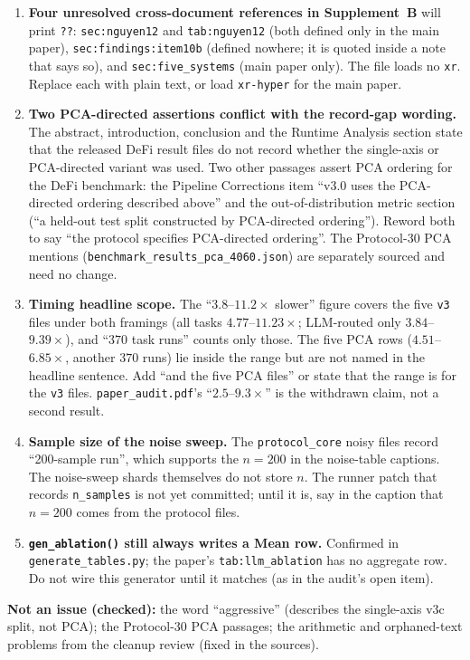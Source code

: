 \documentclass[11pt]{article}
\begin{document}
\begin{enumerate}
  \item \textbf{Four unresolved cross-document references in Supplement~B} will print \texttt{??}: \texttt{sec:nguyen12} and
    \texttt{tab:nguyen12} (both defined only in the main paper), \texttt{sec:findings:item10b} (defined nowhere; it is
    quoted inside a note that says so), and \texttt{sec:five\_systems} (main paper only). The file loads no \texttt{xr}.
    Replace each with plain text, or load \texttt{xr-hyper} for the main paper.
  \item \textbf{Two PCA-directed assertions conflict with the record-gap wording.} The abstract, introduction, conclusion and
    the Runtime Analysis section state that the released DeFi result files do not record whether the single-axis or PCA-directed variant
    was used. Two other passages assert PCA ordering for the DeFi benchmark: the Pipeline Corrections item
    ``v3.0 uses the PCA-directed ordering described above'' and the out-of-distribution metric section (``a held-out test split
    constructed by PCA-directed ordering''). Reword both to say ``the protocol specifies PCA-directed ordering''. The
    Protocol-30 PCA mentions (\texttt{benchmark\_results\_pca\_4060.json}) are separately sourced and need no change.
  \item \textbf{Timing headline scope.} The ``$3.8$--$11.2\times$ slower'' figure covers the five \texttt{v3} files under both
    framings (all tasks $4.77$--$11.23\times$; LLM-routed only $3.84$--$9.39\times$), and ``$370$ task runs'' counts only
    those. The five PCA rows ($4.51$--$6.85\times$, another $370$ runs) lie inside the range but are not named in the
    headline sentence. Add ``and the five PCA files'' or state that the range is for the \texttt{v3} files.
    \texttt{paper\_audit.pdf}'s ``$2.5$--$9.3\times$'' is the withdrawn claim, not a second result.
  \item \textbf{Sample size of the noise sweep.} The \texttt{protocol\_core} noisy files record ``200-sample run'', which
    supports the $n=200$ in the noise-table captions. The noise-sweep shards themselves do not store $n$. The runner patch that
    records \texttt{n\_samples} is not yet committed; until it is, say in the caption that $n=200$ comes from the protocol files.
  \item \textbf{\texttt{gen\_ablation()} still always writes a Mean row.} Confirmed in \texttt{generate\_tables.py}; the paper's
    \texttt{tab:llm\_ablation} has no aggregate row. Do not wire this generator until it matches (as in the audit's open item).
\end{enumerate}
\textbf{Not an issue (checked):} the word ``aggressive'' (describes the single-axis v3c split, not PCA); the Protocol-30 PCA
passages; the arithmetic and orphaned-text problems from the cleanup review (fixed in the sources).
\end{document}
